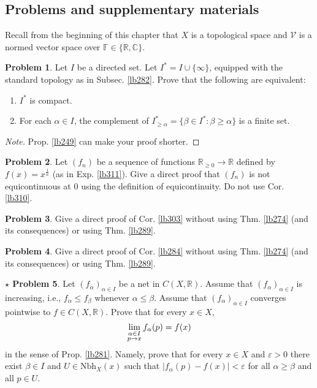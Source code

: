 \documentclass[12pt,b5paper,notitlepage]{article}
\theoremstyle{definition}
\newtheorem{prob}{\color{red}Problem}[section]
\newtheorem{sprob}[prob]{\color{red}$\star$ Problem}
\theoremstyle{plain}
\newcommand{\mc}{\mathcal}
\newcommand{\Cbb}{\mathbb C}
\newcommand{\Rbb}{\mathbb R}
\newcommand{\Fbb}{\mathbb F}
\newcommand{\Nbh}{\mathrm{Nbh}}
\newcommand{\eps}{\varepsilon}
\numberwithin{equation}{section}
\begin{document}
\subsection{Problems and supplementary materials}


Recall from the beginning of this chapter that $X$ is a topological space and $\mc V$ is a normed vector space over $\Fbb\in\{\Rbb,\Cbb\}$.

\begin{prob}\label{lb283}
Let $I$ be a directed set. Let $I^*=I\cup\{\infty\}$, equipped with the standard topology as in Subsec. \ref{lb282}. Prove that the following are equivalent:
\begin{enumerate}[label=(\arabic*)]
\item $I^*$ is compact.
\item For each $\alpha\in I$, the complement of $I^*_{\geq\alpha}=\{\beta\in I^*:\beta\geq\alpha\}$ is a finite set.
\end{enumerate}
\end{prob}


\begin{proof}[Note]
Prop. \ref{lb249} can make your proof shorter.
\end{proof}


\begin{prob}
Let $(f_n)$ be a sequence of functions $\Rbb_{\geq0}\rightarrow\Rbb$ defined by $f(x)=x^{\frac 1n}$ (as in Exp. \ref{lb311}). Give a direct proof that $(f_n)$ is not equicontinuous at $0$ using the definition of equicontinuity. Do not use Cor. \ref{lb310}.
\end{prob}


\begin{prob}
Give a direct proof of Cor. \ref{lb303} without using Thm. \ref{lb274} (and its consequences) or using Thm. \ref{lb289}.
\end{prob}

\begin{prob}
Give a direct proof of Cor. \ref{lb284} without using Thm. \ref{lb274} (and its consequences) or using Thm. \ref{lb289}.
\end{prob}

\begin{sprob}\label{lb285}
Let $(f_\alpha)_{\alpha\in I}$ be a net in $C(X,\Rbb)$. Assume that $(f_\alpha)_{\alpha\in I}$ is increasing, i.e., $f_\alpha\leq f_\beta$ whenever $\alpha\leq\beta$. Assume that $(f_\alpha)_{\alpha\in I}$ converges pointwise to $f\in C(X,\Rbb)$. Prove that for every $x\in X$,
\begin{align}
\lim_{
\begin{subarray}{c}
\alpha\in I\\
p\rightarrow x
\end{subarray}
}
f_\alpha(p)=f(x)
\end{align}
in the sense of Prop. \ref{lb281}. Namely, prove that for every $x\in X$ and $\eps>0$ there exist $\beta\in I$ and $U\in\Nbh_X(x)$ such that $|f_\alpha(p)-f(x)|<\eps$ for all $\alpha\geq\beta$ and all $p\in U$.
\end{sprob}
\end{document}
